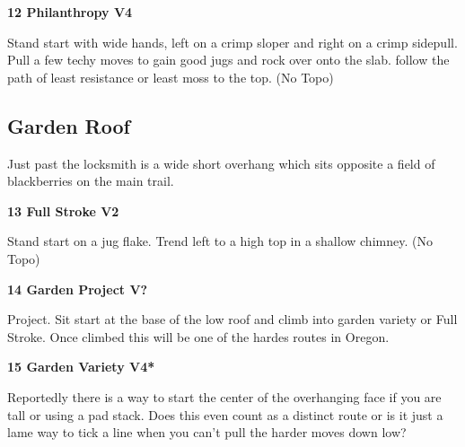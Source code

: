 \begin{multicols}{2}
			
			\needspace{1.5cm}
\label{rt:Philanthropy}
\colorbox{RoyalBlue!20}{
\parbox{0.95\linewidth}{
\textbf{
12 Philanthropy V4  \warn\warn
}}}

			\begin{adjustwidth}{0.5cm}{}			
			Stand start with wide hands, left on a crimp sloper and right on a crimp sidepull. Pull a few techy moves to gain good jugs and rock over onto the slab. follow the path of least resistance or least moss to the top. (No Topo)
			\end{adjustwidth}
			
			
		
		
		\needspace{1.5cm}
		\subsection*{Garden Roof}\label{bf:Garden Roof}
		Just past the locksmith is a wide short overhang which sits opposite a field of blackberries on the main trail.\\
	
		
			
			\needspace{1.5cm}
\label{rt:Full Stroke}
\colorbox{green!20}{
\parbox{0.95\linewidth}{
\textbf{
13 Full Stroke V2  \warn
}}}

			\begin{adjustwidth}{0.5cm}{}			
			Stand start on a jug flake. Trend left to a high top in a shallow chimney. (No Topo)
			\end{adjustwidth}
			
			


			\needspace{1.5cm}
\label{rt:Garden Project}
\colorbox{black!20}{
\parbox{0.95\linewidth}{
\textbf{
14 Garden Project V?  
}}}

			\begin{adjustwidth}{0.5cm}{}			
			Project. Sit start at the base of the low roof and climb into garden variety or Full Stroke. Once climbed this will be one of the hardes routes in Oregon.
			\end{adjustwidth}
			
			
			
			\needspace{1.5cm}
\label{rt:Garden Variety}
\colorbox{RoyalBlue!20}{
\parbox{0.95\linewidth}{
\textbf{
15 Garden Variety V4*  
}}}

			\begin{adjustwidth}{0.5cm}{}			
			Reportedly there is a way to start the center of the overhanging face if you are tall or using a pad stack. Does this even count as a distinct route or is it just a lame way to tick a line when you can't pull the harder moves down low?
			\end{adjustwidth}
			

\end{multicols}
